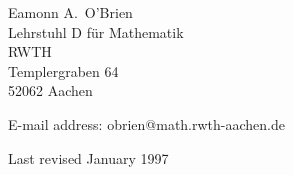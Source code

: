 \noindent 
Eamonn A.\ O'Brien \\
Lehrstuhl D f\"ur Mathematik \\
RWTH  \\
Templergraben 64  \\
52062 Aachen 

\vspace*{0.25cm}
\noindent 
E-mail address: obrien@math.rwth-aachen.de 

\vspace*{0.35cm}
\noindent 
Last revised January 1997

